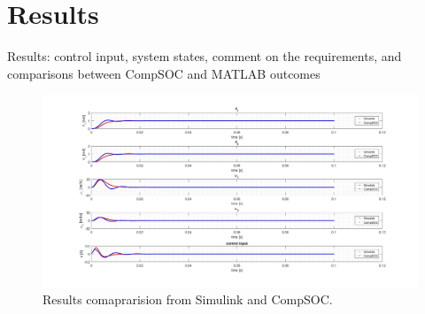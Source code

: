 \section{Results}


\color{red}
Results:	control	input,	system	states,	comment	on	the	requirements,	and	comparisons	
between	CompSOC and	MATLAB	outcomes
\color{black}


\begin{figure}[h]
	\begin{center}
		\includegraphics[width=\linewidth]{img/p400}
		\caption{Results comaprarision from Simulink and CompSOC.}
		\label{fig:p400}
	\end{center}
\end{figure}
